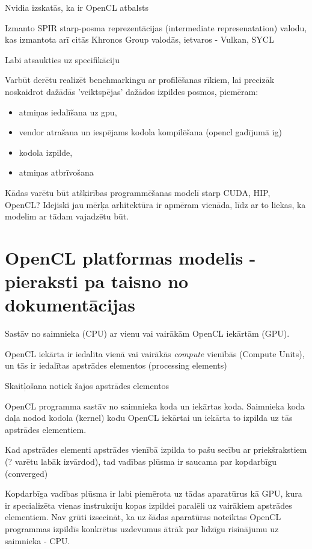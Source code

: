 \documentclass[12pt]{report}%
\theoremstyle{definition}
\begin{document}
Nvidia izskatās, ka ir OpenCL atbalsts

Izmanto SPIR starp-posma reprezentācijas (intermediate represenatation) valodu, kas izmantota arī citās Khronos Group
valodās, ietvaros - Vulkan, SYCL

Labi atsaukties uz specifikāciju \cite{opencl-spec}

Varbūt derētu realizēt benchmarkingu ar profilēšanas rīkiem, lai precizāk noskaidrot dažādās 'veiktspējas'
dažādos izpildes posmos, piemēram:
\begin{itemize}
    \item atmiņas iedalīšana uz gpu,
    \item vendor atrašana un iespējams kodola kompilēšana (opencl gadījumā ig)
    \item kodola izpilde,
    \item atmiņas atbrīvošana
\end{itemize}


Kādas varētu būt atšķirības programmēšanas modelī starp CUDA, HIP, OpenCL? Idejiski jau mērķa arhitektūra ir
apmēram vienāda, līdz ar to liekas, ka modelim ar tādam vajadzētu būt.



\section{OpenCL platformas modelis - pieraksti pa taisno no dokumentācijas}
Sastāv no saimnieka (CPU) ar vienu vai vairākām OpenCL iekārtām (GPU).

OpenCL iekārta ir iedalīta vienā vai vairākās \textit{compute} vienībās (Compute Units), un tās ir iedalītas apstrādes elementos (processing elements)

Skaitļošana notiek šajos apstrādes elementos

OpenCL programma sastāv no saimnieka koda un iekārtas koda. 
Saimnieka koda daļa nodod kodola (kernel) kodu OpenCL iekārtai un iekārta to izpilda uz tās apstrādes elementiem.


Kad apstrādes elementi apstrādes vienībā izpilda to pašu secību ar priekšrakstiem (? varētu labāk izvārdod), tad vadības plūsma ir saucama par kopdarbīgu (converged)

Kopdarbīga vadības plūsma ir labi piemērota uz tādas aparatūrus kā GPU, kura ir specializēta vienas instrukciju kopas izpildei paralēli uz vairākiem apstrādes elementiem.
Nav grūti izsecināt, ka uz šādas aparatūras noteiktas OpenCL programmas izpildīs konkrētus uzdevumus ātrāk par līdzīgu risinājumu uz saimnieka - CPU.
\end{document}
